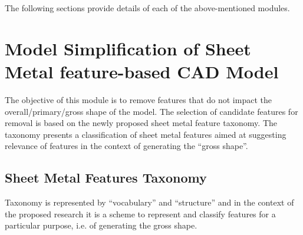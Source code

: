 The following sections provide details of each of the above-mentioned modules. 

\section{Model Simplification of Sheet Metal feature-based CAD Model} \label{cagd:sec:defeaturing}
The objective of this module is to remove features that do not impact the overall/primary/gross shape of the model. The selection of candidate features for removal is based on the newly proposed sheet metal feature taxonomy. The taxonomy presents a classification of sheet metal features aimed at suggesting relevance of features in the context of generating the ``gross shape''.

\subsection{Sheet Metal Features Taxonomy}\label{sec:defeaturing:taxonomy}

Taxonomy is represented by ``vocabulary'' and ``structure'' and in the context of the proposed research it is a scheme to represent and classify features for a particular purpose, i.e. of generating the gross shape.

